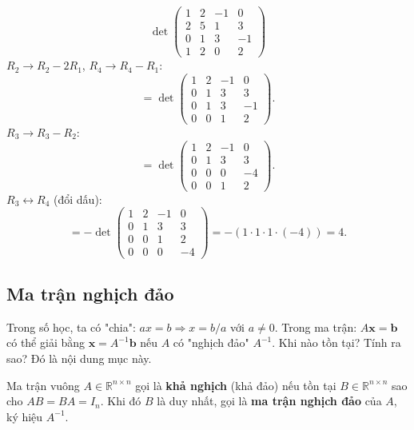 \documentclass[12pt,a4paper]{article}
\begin{document}
\begin{vidu}[title={Định thức cấp 4 bằng biến đổi sơ cấp}]
\[
  \det \begin{pmatrix}1&2&-1&0\\ 2&5&1&3\\ 0&1&3&-1\\ 1&2&0&2\end{pmatrix}
\]
$R_2 \to R_2 - 2R_1$, $R_4 \to R_4 - R_1$:
\[
  = \det\begin{pmatrix}1&2&-1&0\\ 0&1&3&3\\ 0&1&3&-1\\ 0&0&1&2\end{pmatrix}.
\]
$R_3 \to R_3 - R_2$:
\[
  = \det\begin{pmatrix}1&2&-1&0\\ 0&1&3&3\\ 0&0&0&-4\\ 0&0&1&2\end{pmatrix}.
\]
$R_3 \leftrightarrow R_4$ (đổi dấu):
\[
  = -\det\begin{pmatrix}1&2&-1&0\\ 0&1&3&3\\ 0&0&1&2\\ 0&0&0&-4\end{pmatrix} = -(1\cdot 1\cdot 1\cdot(-4)) = 4.
\]
\end{vidu}

\subsection{Ma trận nghịch đảo}

\begin{dongco}
Trong số học, ta có "chia": $ax = b \Rightarrow x = b/a$ với $a \ne 0$. Trong ma trận: $A\mathbf{x} = \mathbf{b}$ có thể giải bằng $\mathbf{x} = A^{-1}\mathbf{b}$ nếu $A$ có "nghịch đảo" $A^{-1}$. Khi nào tồn tại? Tính ra sao? Đó là nội dung mục này.
\end{dongco}

\begin{dinhnghia}
  Ma trận vuông $A \in \mathbb{R}^{n\times n}$ gọi là \textbf{khả nghịch} (khả đảo) nếu tồn tại $B \in \mathbb{R}^{n\times n}$ sao cho $AB = BA = I_n$. Khi đó $B$ là duy nhất, gọi là \textbf{ma trận nghịch đảo} của $A$, ký hiệu $A^{-1}$.
\end{dinhnghia}
\end{document}
